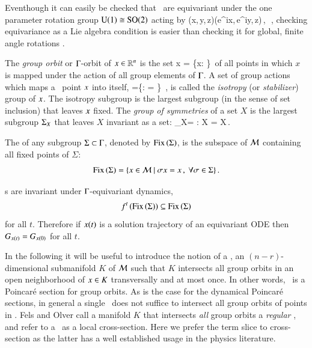 Eventhough it can easily be checked that \cLe\ are 
equivariant under the one parameter rotation
group $\textrm{U}(1)\cong\textrm{SO}(2)$ acting by
\beq\label{eq:SO2cle}
	(x,\,y,\,z)\mapsto (e^{i\theta}x,\,e^{i\theta}y,\,z)\,,\ \theta\in[0,2\pi]\,,
\eeq
checking equivariance as a Lie algebra condition
 is easier than checking it for global,
finite angle rotations .

The \emph{group orbit} or $\Gamma$-orbit of
$x\in\mathbb{R}^{n}$ is the set
\beq
	\Group x = \{\Glmn x: \Glmn\in\Group\}\,
\eeq
of all points in which $x$ is mapped under the action of all
group elements of $\Gamma$.
A set of group actions which maps a \statesp\ point $x$ into itself,
\beq
\stab{\ssp} =\{\Glmn \in \Group: \Glmn \ssp = \ssp \}
    \,,
is called the \emph{isotropy} (or \emph{stabilizer})  group of $\ssp$.
The isotropy subgroup is the largest subgroup (in the
sense of set inclusion) that leaves $\ssp$ fixed.
The \emph{group of symmetries} of a set $X$ is the largest
subgroup $\Subgroup_X$ that leaves $X$ invariant as a set:
\beq
	\Subgroup_X= {\Glmn: \Glmn X = X}\,.
\eeq

The \emph{\fixedsp} of any subgroup $\Sigma\subset\Gamma$,
denoted by $\mathrm{Fix}\left(\Sigma\right)$, is the subspace of $\mathcal{M}$ containing all fixed points of $\Sigma$:
\[
	\mathrm{Fix}\left(\Sigma\right)=\{x\in\mathcal{M}\ |\ \sigma x = x\,,\ \forall \sigma\in\Sigma\}\,.
\]

\Fixedsp s are invariant under $\Gamma$-equivariant dynamics,
\[
 f^t\left(\mathrm{Fix}\left(\Sigma\right)\right)\subseteq \mathrm{Fix}\left(\Sigma\right)
\] for all
$t$. Therefore if $x(t)$ is a solution trajectory of an
equivariant ODE then $G_{x(t)}=G_{x(0)}$ for all $t$.

In the following it will be useful to introduce the
notion of a \emph{\slice}, an $(n-r)$-dimensional submanifold $K$
of $\mathcal{M}$ such that $K$ intersects all group orbits in an
open neighborhood of $x \in K$
transversally and at most once.
In other words, \slice\ is a Poincar\'e section for group
orbits. As is the case for the dynamical Poincar\'e sections,
in general a single \slice\ does not suffice to intersect all
group orbits of points in \pS. Fels and Olver
call a manifold $K$ that intersects \emph{all} group orbits a
\emph{regular \csection}, and refer to a \slice\ as a local
cross-section. Here we prefer the term slice
to cross-section as the latter has a well established usage in the physics
literature.  

